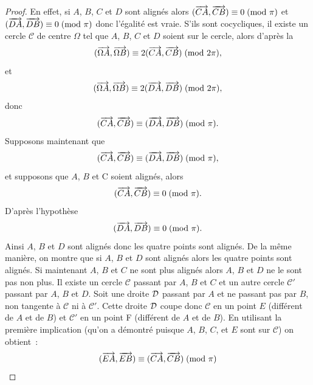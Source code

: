 \begin{proof}
  En effet, si \(A\), \(B\), \(C\) et \(D\) sont alignés alors 
  \((\overrightarrow{CA},\overrightarrow{CB}) \equiv 0\!\pmod {\pi}\) et 
  \((\overrightarrow{DA},\overrightarrow{DB}) \equiv 0\!\pmod {\pi}\) donc l'égalité est vraie. S'ils 
  sont cocycliques, il existe un cercle \(\mathcal{C}\) de centre \(\Omega\) 
  tel que \(A\), \(B\), \(C\) et \(D\) soient sur le cercle, alors d'après la 
  \begin{equation}
    (\overrightarrow{\Omega A}, \overrightarrow{\Omega B}) \equiv 2(\overrightarrow{CA},\overrightarrow{CB})\!\pmod {2\pi},
  \end{equation}
  et \begin{equation}
    (\overrightarrow{\Omega A}, \overrightarrow{\Omega B}) \equiv 2(\overrightarrow{DA},\overrightarrow{DB})\!\pmod {2\pi},
  \end{equation}
  donc \begin{equation}
    (\overrightarrow{CA},\overrightarrow{CB}) \equiv (\overrightarrow{DA},\overrightarrow{DB})\!\pmod {\pi}.
  \end{equation}
  Supposons maintenant que \begin{equation}
    (\overrightarrow{CA},\overrightarrow{CB}) \equiv (\overrightarrow{DA},\overrightarrow{DB})\!\pmod {\pi},
  \end{equation}
  et supposons que \(A\), \(B\) et C soient alignés, alors \begin{equation}
    (\overrightarrow{CA},\overrightarrow{CB}) \equiv 0\!\pmod {\pi}.
  \end{equation}
  D'après l'hypothèse
  \begin{equation}
    (\overrightarrow{DA},\overrightarrow{DB}) \equiv 0\!\pmod {\pi}.
  \end{equation}
  Ainsi \(A\), \(B\) et \(D\) sont alignés donc les quatre points sont 
  alignés. De la même manière, on montre que si \(A\), \(B\) et \(D\) sont 
  alignés alors les quatre points sont alignés. Si maintenant \(A\), \(B\) et 
  \(C\) ne sont plus alignés alors \(A\), \(B\) et \(D\) ne le sont pas non 
  plus. Il existe un cercle \(\mathcal{C}\) passant par \(A\), \(B\) et \(C\) 
  et un autre cercle \(\mathcal{C}'\) passant par \(A\), \(B\) et \(D\). Soit 
  une droite \(\mathcal{D}\) passant par \(A\) et ne passant pas par \(B\), non 
  tangente à \(\mathcal{C}\) ni à \(\mathcal{C}'\). Cette droite \(\mathcal{D}\) coupe 
  donc \(\mathcal{C}\) en un point \(E\) (différent de \(A\) et de \(B\)) et 
  \(\mathcal{C}'\) en un point F (différent de \(A\) et de \(B\)). En 
  utilisant la première implication (qu'on a démontré puisque \(A\), \(B\), 
  \(C\), et \(E\) sont sur \(\mathcal{C}\)) on obtient~:
  \begin{equation}
    \congru{(\vect{EA},\vect{EB})}{(\vect{CA},\vect{CB})}{\pi}

\end{equation}
\end{proof}
